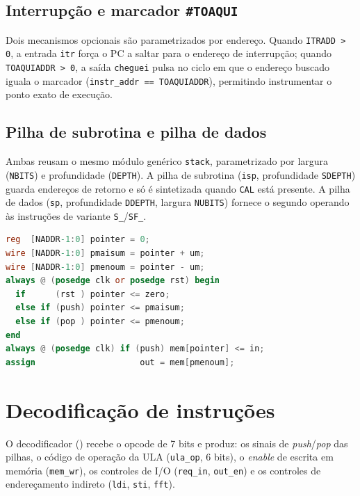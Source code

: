 \subsection{Interrupção e marcador \texttt{\#TOAQUI}}
\label{sec:arq-itr-toaqui}

Dois mecanismos opcionais são parametrizados por endereço. Quando \lstinline|ITRADD > 0|, a
entrada \lstinline|itr| força o PC a saltar para o endereço de interrupção; quando
\lstinline|TOAQUIADDR > 0|, a saída \lstinline|cheguei| pulsa no ciclo em que o endereço
buscado iguala o marcador (\lstinline|instr_addr == TOAQUIADDR|), permitindo instrumentar o
ponto exato de execução.

\subsection{Pilha de subrotina e pilha de dados}
\label{sec:arq-stacks}

Ambas reusam o mesmo módulo genérico \lstinline|stack|, parametrizado por largura
(\lstinline|NBITS|) e profundidade (\lstinline|DEPTH|). A pilha de subrotina
(\lstinline|isp|, profundidade \lstinline|SDEPTH|) guarda endereços de retorno e só é
sintetizada quando \lstinline|CAL| está presente. A pilha de dados (\lstinline|sp|,
profundidade \lstinline|DDEPTH|, largura \lstinline|NUBITS|) fornece o segundo operando às
instruções de variante \lstinline|S_|/\lstinline|SF_|.

\begin{lstlisting}[language=Verilog]
reg  [NADDR-1:0] pointer = 0;
wire [NADDR-1:0] pmaisum = pointer + um;
wire [NADDR-1:0] pmenoum = pointer - um;
always @ (posedge clk or posedge rst) begin
  if      (rst ) pointer <= zero;
  else if (push) pointer <= pmaisum;
  else if (pop ) pointer <= pmenoum;
end
always @ (posedge clk) if (push) mem[pointer] <= in;
assign                     out = mem[pmenoum];
\end{lstlisting}

\section{Decodificação de instruções}
\label{sec:arq-decod}

O decodificador () recebe o opcode de 7 bits e produz: os sinais de
\emph{push}/\emph{pop} das pilhas, o código de operação da ULA (\lstinline|ula_op|, 6 bits),
o \emph{enable} de escrita em memória (\lstinline|mem_wr|), os controles de I/O
(\lstinline|req_in|, \lstinline|out_en|) e os controles de endereçamento indireto
(\lstinline|ldi|, \lstinline|sti|, \lstinline|fft|).

